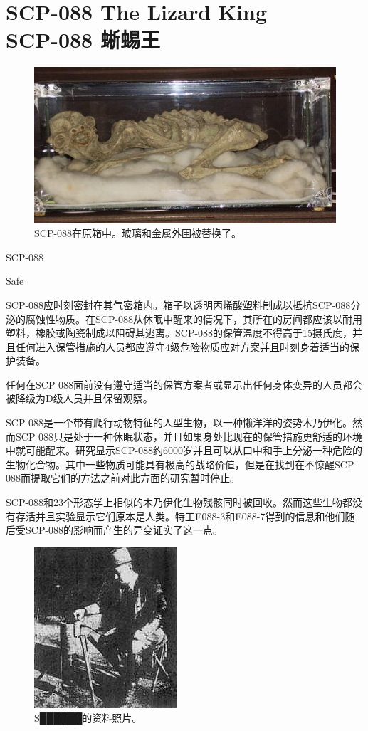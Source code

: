 \chapter[SCP-088 蜥蜴王]{
    SCP-088 The Lizard King\\
    SCP-088 蜥蜴王
}

\label{chap:SCP-088}

\begin{figure}[H]
    \centering
    \includegraphics[width=0.5\linewidth]{images/SCP-088.jpg}
    \caption*{SCP-088在原箱中。玻璃和金属外围被替换了。}
\end{figure}

SCP-088

Safe

SCP-088应时刻密封在其气密箱内。箱子以透明丙烯酸塑料制成以抵抗SCP-088分泌的腐蚀性物质。在SCP-088从休眠中醒来的情况下，其所在的房间都应该以耐用塑料，橡胶或陶瓷制成以阻碍其逃离。SCP-088的保管温度不得高于15摄氏度，并且任何进入保管措施的人员都应遵守4级危险物质应对方案并且时刻身着适当的保护装备。

任何在SCP-088面前没有遵守适当的保管方案者或显示出任何身体变异的人员都会被降级为D级人员并且保留观察。

SCP-088是一个带有爬行动物特征的人型生物，以一种懒洋洋的姿势木乃伊化。然而SCP-088只是处于一种休眠状态，并且如果身处比现在的保管措施更舒适的环境中就可能醒来。研究显示SCP-088约6000岁并且可以从口中和手上分泌一种危险的生物化合物。其中一些物质可能具有极高的战略价值，但是在找到在不惊醒SCP-088而提取它们的方法之前对此方面的研究暂时停止。

SCP-088和23个形态学上相似的木乃伊化生物残骸同时被回收。然而这些生物都没有存活并且实验显示它们原本是人类。特工E088-3和E088-7得到的信息和他们随后受SCP-088的影响而产生的异变证实了这一点。

\begin{figure}[H]
    \centering
    \includegraphics[width=0.5\linewidth]{images/SCP-088-2.jpg}
    \caption*{S██████的资料照片。}
\end{figure}

